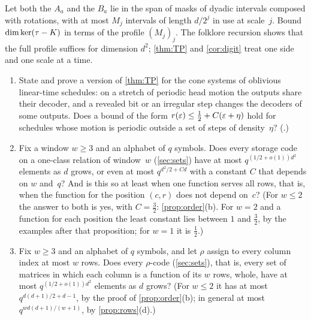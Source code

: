 \begin{problem}\label{prob:both}
Let both the $A_a$ and the $B_a$ lie in the span of masks of dyadic intervals composed with rotations, with at most $M_j$
intervals of length $d/2^j$ in use at scale~$j$. Bound $\dim\ker(\tau-K)$ in terms of the profile $(M_j)_j$. The folklore
recursion shows that the full profile suffices for dimension $d^2$; \cref{thm:TP} and \cref{cor:digit} treat one side
and one scale at a time.
\end{problem}

\begin{problem}\label{prob:machines}
\begin{enumerate}[label=(\alph*),leftmargin=2em]
\item State and prove a version of \cref{thm:TP} for the cone systems of oblivious linear-time schedules: on a stretch
of periodic head motion the outputs share their decoder, and a revealed bit or an irregular step changes the decoders
of some outputs. Does a bound of the form $r(\varepsilon)\le\tfrac12+C(\varepsilon+\eta)$ hold for schedules whose motion is
periodic outside a set of steps of density~$\eta$? (.)
\item Fix a window $w\ge3$ and an alphabet of $q$ symbols. Does every storage code on a one-class relation of
window~$w$ (\cref{sec:sets}) have at most $q^{(1/2+o(1))d^2}$ elements as $d$ grows, or even at most $q^{d^2/2+Cd}$
with a constant $C$ that depends on $w$ and~$q$? And is this so at least when one function serves all rows, that is,
when the function for the position $(c,r)$ does not depend on~$c$? (For $w\le2$ the answer to both is yes, with
$C=\tfrac32$: \cref{prop:order}(b). For $w=2$ and a function for each position the least constant lies between $1$
and $\tfrac32$, by the examples after that proposition; for $w=1$ it is $\tfrac12$.)
\item Fix $w\ge3$ and an alphabet of $q$ symbols, and let $\rho$ assign to every column index at most $w$ rows. Does
every $\rho$-code (\cref{sec:sets}), that is, every set of matrices in which each column is a function of its $w$
rows, whole, have at most $q^{(1/2+o(1))d^2}$ elements as $d$ grows? (For $w\le2$ it has at most
$q^{d(d+1)/2+d-1}$, by the proof of \cref{prop:order}(b); in general at most $q^{wd(d+1)/(w+1)}$, by
\cref{prop:rows}(d).)
\end{enumerate}
\end{problem}

